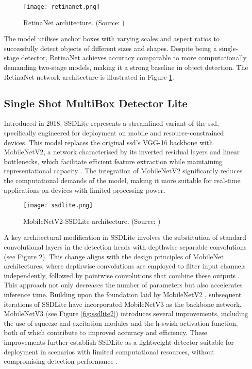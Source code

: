 \begin{figure}[!htbp]
    \centering
    \texttt{[image: retinanet.png]}
    \caption{RetinaNet architecture. (Source: \cite{retinanet})}
    \label{fig:retinanet}
\end{figure}

The model utilises anchor boxes with varying scales and aspect ratios to successfully detect objects of different sizes and shapes. Despite being a single-stage detector, RetinaNet achieves accuracy comparable to more computationally demanding two-stage models, making it a strong baseline in object detection. The RetinaNet network architecture is illustrated in Figure \ref{fig:retinanet}.


\subsection{Single Shot MultiBox Detector Lite}
\label{subsec:4_ssdlite}

Introduced in 2018, SSDLite \cite{ssdlite} represents a streamlined variant of the \gls{ssd}, specifically engineered for deployment on mobile and resource-constrained devices. This model replaces the original \gls{ssd}'s VGG-16 backbone with MobileNetV2, a network characterised by its inverted residual layers and linear bottlenecks, which facilitate efficient feature extraction while maintaining representational capacity \cite{ssdlite}. The integration of MobileNetV2 significantly reduces the computational demands of the model, making it more suitable for real-time applications on devices with limited processing power.

\begin{figure}[!htbp]
    \centering
    \texttt{[image: ssdlite.png]}
    \caption{MobileNetV2-SSDLite architecture. (Source: \cite{ssdlite_diagram})}
    \label{fig:ssdlite}
\end{figure}

A key architectural modification in SSDLite involves the substitution of standard convolutional layers in the detection heads with depthwise separable convolutions (see Figure \ref{fig:ssdlite}). This change aligns with the design principles of MobileNet architectures, where depthwise convolutions are employed to filter input channels independently, followed by pointwise convolutions that combine these outputs \cite{mobilenet}. This approach not only decreases the number of parameters but also accelerates inference time.
Building upon the foundation laid by MobileNetV2 \cite{ssdlite}, subsequent iterations of SSDLite have incorporated MobileNetV3 \cite{mobilenetv3} as the backbone network. MobileNetV3 (see Figure \ref{fig:ssdlite2}) introduces several improvements, including the use of squeeze-and-excitation modules and the h-swish activation function, both of which contribute to improved accuracy and efficiency. These improvements further establish SSDLite as a lightweight detector suitable for deployment in scenarios with limited computational resources, without compromising detection performance \cite{ssdlite}.

